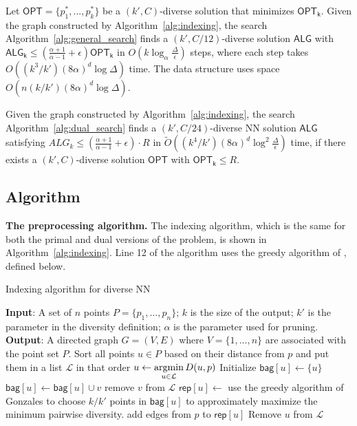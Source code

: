 \begin{theorem} \label{thm:diverse_ann}
Let $\mathsf{OPT}=\{p^*_1,...,p^*_k\}$ be a $(k',C)$-diverse solution that minimizes $\mathsf{\mathsf{OPT_k}}$. Given the graph constructed by Algorithm~\ref{alg:indexing}, the search Algorithm~\ref{alg:general_search} finds a $(k',C/12)$-diverse solution $\mathsf{ALG}$ with $\mathsf{ALG_k}\le \left(\frac{\alpha+1}{\alpha-1}+\epsilon\right)\mathsf{OPT_k}$ in $O\left(k\log_{\alpha}\frac{\Delta}{\epsilon}\right)$ steps, where each step takes $O\left((k^3/k')(8\alpha)^d\log \Delta\right)$ time.
The data structure uses space $O(n(k/k')(8\alpha)^d\log\Delta)$.
\end{theorem}

\smallskip
\begin{theorem} \label{thm:dual_diverse_ann}
Given the graph constructed by Algorithm~\ref{alg:indexing}, the search Algorithm~\ref{alg:dual_search} finds a $(k',C/24)$-diverse NN solution $\mathsf{ALG}$ satisfying $ALG_k\le \left(\frac{\alpha+1}{\alpha-1}+\epsilon\right)\cdot R$ in $\tilde{O}\left((k^4/k')(8\alpha)^d\log^2\frac{\Delta}{\epsilon}\right)$ time, if there exists a $(k',C)$-diverse solution $\mathsf{OPT}$ with $\mathsf{OPT_k}\le R$.
\end{theorem}


\subsection{Algorithm}
\noindent\textbf{The preprocessing algorithm.} The indexing algorithm, which is the same for both the primal and dual versions of the problem, is shown in Algorithm~\ref{alg:indexing}. Line 12 of the algorithm uses the greedy algorithm of \cite{gonzalez1985clustering}, defined below.


\begin{algorithm}
\caption{Indexing algorithm for diverse NN}
\label{alg:indexing}
\begin{algorithmic}[1]
\STATE \textbf{Input}: A set of $n$ points $P=\{p_1,...,p_n\}$; $k$ is the size of the output; $k'$ is the parameter in the diversity definition; $\alpha$ is the parameter used for pruning.
\STATE \textbf{Output}: A directed graph $G=(V,E)$ where $V=\{1,...,n\}$ are associated with the point set $P$.
    \STATE Sort all points $u\in P$ based on their distance from $p$ and put them in a list $\mathcal{L}$ in that order
        \STATE $u\gets \operatorname*{argmin}\limits_{u\in \mathcal{L}}D(u,p)$
        \STATE Initialize $\mathsf{bag}[u]\gets \{u\}$
                \STATE $\mathsf{bag}[u]\gets \mathsf{bag}[u]\cup v$
                \STATE remove $v$ from $\mathcal{L}$
            \ENDIF
        \ENDFOR
        \STATE $\mathsf{rep}[u]\gets$ use the greedy algorithm of Gonzales to choose $k/k'$ points in $\mathsf{bag}[u]$ to approximately maximize the minimum pairwise diversity.
        \STATE add edges from $p$ to $\mathsf{rep}[u]$
        \STATE Remove $u$ from $\mathcal{L}$
    \ENDWHILE
\ENDFOR
\end{algorithmic}
\end{algorithm}


